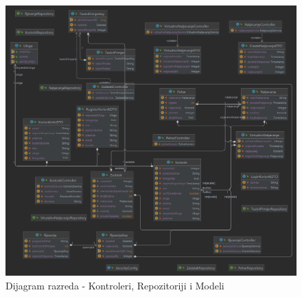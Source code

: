 \begin{figure}[H]
	\includegraphics[scale=0.39]{dijagrami/apiDiagram.png}
	\centering
	\caption{Dijagram razreda - Kontroleri, Repozitoriji i Modeli}
\end{figure}

%
%
%
%
%
%
%
%
%
%
%
%
%
%
%
%
